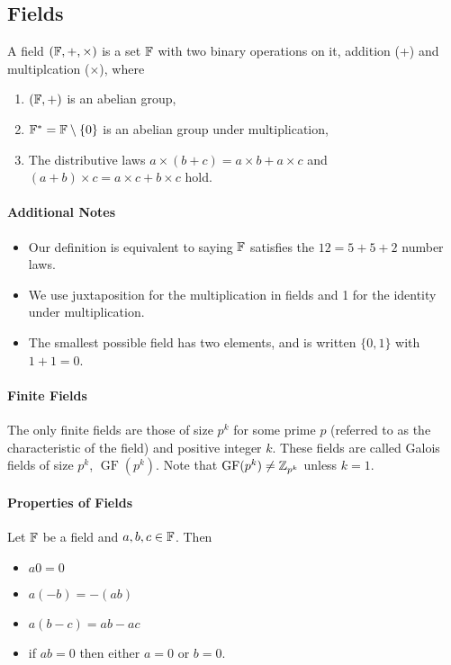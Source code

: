 \subsection{Fields}
A field \((\mathbb{F}, +, \times)\) is a set \(\mathbb{F}\) with two binary operations on it, addition (+) and multiplcation (\(\times\)), where 
\begin{enumerate}
    \item \((\mathbb{F}, +)\) is an abelian group,
    \item \(\mathbb{F}^* = \mathbb{F}\setminus\{0\}\) is an abelian group under multiplication,
    \item The distributive laws \(a \times (b + c) = a \times b + a \times c\) and \((a+b) \times c = a \times c + b \times c\) hold.
\end{enumerate}

\paragraph{Additional Notes}
\begin{itemize}
    \item Our definition is equivalent to saying \(\mathbb{F}\) satisfies the \(12 = 5 + 5 + 2\) number laws.
    \item We use juxtaposition for the multiplication in fields and 1 for the identity under multiplication.
    \item The smallest possible field has two elements, and is written \(\{0,1\}\) with \(1 + 1 = 0\).
\end{itemize}

\paragraph{Finite Fields}
The only finite fields are those of size \(p^k\) for some prime \(p\) (referred to as the characteristic of the field) and positive integer \(k\). These fields are called Galois fields of size \(p^k\), \(\operatorname{GF}(p^k)\). Note that \(\operatorname{GF}(p^k) \neq \mathbb{Z}_{p^k}\) unless \(k=1\).

\paragraph{Properties of Fields}
Let \(\mathbb{F}\) be a field and \(a,b,c \in \mathbb{F}\). Then
\begin{itemize}
    \item \(a0=0\)
    \item \(a(-b) = -(ab)\)
    \item \(a(b - c) = ab - ac\)
    \item if \(ab = 0\) then either \(a = 0\) or \(b = 0\).
\end{itemize}

